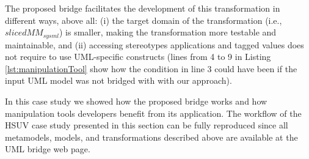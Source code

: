 The proposed bridge facilitates
the development of this transformation in different ways, above all: 
(i) the target domain of the transformation (i.e., $slicedMM_{sysml}$) is smaller, 
making the transformation more testable and maintainable, and 
(ii) accessing stereotypes applications and tagged values 
does not require to use UML-specific constructs (lines from 4 to 9 in Listing \ref{lst:manipulationTool} 
show how the condition in line 3 could have been if the input UML model was not bridged with with our approach).

In this case study we showed how the proposed bridge works and how manipulation tools developers benefit
from its application. 
The workflow of the HSUV case study presented in this section can be fully reproduced
since all metamodels, models, and transformations described above are available at the UML bridge web page.


